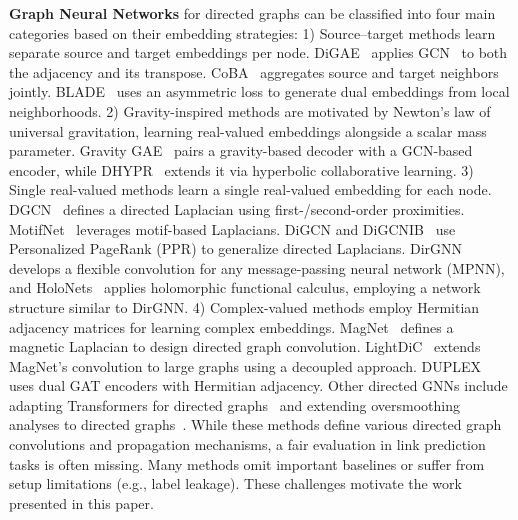\textbf{Graph Neural Networks} for directed graphs can be classified into four main categories based on their embedding strategies: 1) Source–target methods learn separate source and target embeddings per node. DiGAE~\citep{digae} applies GCN~\citep{gcn} to both the adjacency and its transpose. CoBA~\citep{coba} aggregates source and target neighbors jointly. BLADE~\citep{blade} uses an asymmetric loss to generate dual embeddings from local neighborhoods. 2) Gravity-inspired methods are motivated by Newton’s law of universal gravitation, learning real-valued embeddings alongside a scalar mass parameter. Gravity GAE~\citep{gragae} pairs a gravity-based decoder with a GCN-based encoder, while DHYPR~\citep{dhypr} extends it via hyperbolic collaborative learning. 3) Single real-valued methods learn a single real-valued embedding for each node. DGCN~\citep{dgcn-tong} defines a directed Laplacian using first-/second-order proximities. MotifNet~\citep{motifnet} leverages motif-based Laplacians. DiGCN and DiGCNIB~\citep{digcn} use Personalized PageRank (PPR) to generalize directed Laplacians. DirGNN~\citep{dirgnn} develops a flexible convolution for any message-passing neural network (MPNN), and HoloNets~\citep{holonets} applies holomorphic functional calculus, employing a network structure similar to DirGNN. 4) Complex-valued methods employ Hermitian adjacency matrices for learning complex embeddings. MagNet~\citep{magnet} defines a magnetic Laplacian to design directed graph convolution. LightDiC~\citep{lightdic} extends MagNet’s convolution to large graphs using a decoupled approach. DUPLEX~\citep{duplex} uses dual GAT encoders with Hermitian adjacency. Other directed GNNs include adapting Transformers for directed graphs~\citep{tf_digraph} and extending oversmoothing analyses to directed graphs~\citep{fractional}.
While these methods define various directed graph convolutions and propagation mechanisms, a fair evaluation in link prediction tasks is often missing. Many methods omit important baselines or suffer from setup limitations (e.g., label leakage). These challenges motivate the work presented in this paper.



